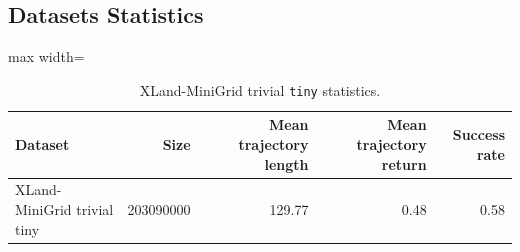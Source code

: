 \documentclass{article}
\begin{document}
\subsection{Datasets Statistics}
\begin{table}[ht]
    \label{tab:trivial_stats}
    \begin{center}
        \caption{XLand-MiniGrid trivial \texttt{tiny} statistics.}
    \begin{small}
    \begin{adjustbox}{max width=\columnwidth}
		\begin{tabular}{l|rrrr}
		\toprule
	\textbf{Dataset} & \textbf{Size} & \textbf{Mean trajectory length} & \textbf{Mean trajectory return} & \textbf{Success rate}\\
\midrule
XLand-MiniGrid trivial tiny & 203090000 & 129.77 & 0.48 & 0.58\\
\bottomrule
\end{tabular}
        \end{adjustbox}
    \end{small}
    \end{center}
    \vskip -0.1in
\end{table}
\end{document}
